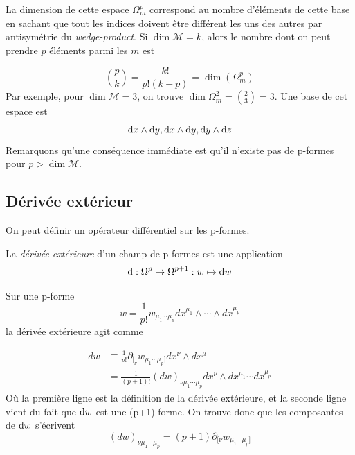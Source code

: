 La dimension de cette espace $\Omega^{p}_m$ correspond au nombre d'éléments de cette base en sachant que tout les indices doivent être différent les uns des autres par antisymétrie du \emph{wedge-product}. Si $\dim \mathcal{M} = k$, alors le nombre dont on peut prendre $p$ éléments parmi les $m$ est 

\begin{equation*}
{p \choose k} = \frac{k!}{p!(k-p)} = \dim(\Omega^{p}_m)
\end{equation*}
Par exemple, pour $\dim \mathcal{M} = 3$, on trouve $\dim \Omega_m^2 = {2\choose 3} = 3$. Une base de cet espace est
\begin{equation}
    \mathrm{d} x \wedge \mathrm{d} y , \mathrm{d} x \wedge \mathrm{d} y , \mathrm{d} y \wedge \mathrm{d} z
\end{equation} 
Remarquons qu'une conséquence immédiate est qu'il n'existe pas de p-formes pour $p>\dim \mathcal{M}$.


\subsection{Dérivée extérieur}
On peut définir un opérateur différentiel sur les p-formes.
\begin{theoremframe}
    \begin{defi}
        La \emph{dérivée extérieure} d'un champ de p-formes est une application
        \begin{equation}
            \mathrm{d} :\Omega^p \to \Omega^{p+1}:w\mapsto \mathrm{d} w
        \end{equation}
    \end{defi}
\end{theoremframe}
Sur une p-forme 
\begin{equation}
     w = \frac{1}{p!}w_{\mu_1 \cdots \mu_p}dx^{\mu_1}\wedge \cdots \wedge dx^{\mu_p}
\end{equation}
la dérivée extérieure agit comme

\begin{align}
    dw &\equiv \frac{1}{p!}\partial_{[_{\nu }}w_{\mu_1 \cdots \mu_p]}dx^{\nu}\wedge dx^{\mu}\\
    &= \frac{1}{(p+1)!}(dw)_{\nu \mu_1 \cdots \mu_p}dx^{\nu}\wedge dx^{\mu_1}\cdots dx^{\mu_p}
\end{align}
Où la première ligne est la définition de la dérivée extérieure, et la seconde ligne vient du fait que $\mathrm{d} w$ est une (p+1)-forme. On trouve donc que les composantes de $\mathrm{d} w$ s'écrivent
\begin{equation}
    (dw)_{\nu \mu_1 \cdots \mu_p} = (p+1)\partial_{[{\nu }}w_{\mu_1 \cdots \mu_p]}
\end{equation}

